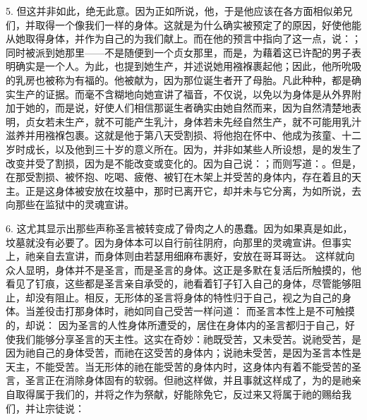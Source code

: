 5. 但这并非如此，绝无此意。因为正如所说，他，于是他应该在各方面相似弟兄们，并取得一个像我们一样的身体。这就是为什么确实被预定了的原因，好使他能从她取得身体，并作为自己的为我们献上。而在他的预言中指向了这一点，说：；同时被派到她那里——不是随便到一个贞女那里，而是，为藉着这已许配的男子表明确实是一个人。为此，也提到她生产，并述说她用襁褓裹起他；因此，他所吮吸的乳房也被称为有福的。他被献为，因为那位诞生者开了母胎。凡此种种，都是确实生产的证据。而毫不含糊地向她宣讲了福音，不仅说，以免以为身体是从外界附加于她的，而是说，好使人们相信那诞生者确实由她自然而来，因为自然清楚地表明，贞女若未生产，就不可能产生乳汁，身体若未先经自然生产，就不可能用乳汁滋养并用襁褓包裹。这就是他于第八天受割损、将他抱在怀中、他成为孩童、十二岁时成长，以及他到三十岁的意义所在。因为，并非如某些人所设想，是的发生了改变并受了割损，因为是不能改变或变化的。因为自己说：；而则写道：。但是，在那受割损、被怀抱、吃喝、疲倦、被钉在木架上并受苦的身体内，存在着且的天主。正是这身体被安放在坟墓中，那时已离开它，却并未与它分离，为如所说，去向那些在监狱中的灵魂宣讲。\par

6. 这尤其显示出那些声称圣言被转变成了骨肉之人的愚蠢。因为如果真是如此，坟墓就没有必要了。因为身体本可以自行前往阴府，向那里的灵魂宣讲。但事实上，祂亲自去宣讲，而身体则由若瑟用细麻布裹好，安放在哥耳哥达。 这样就向众人显明，身体并不是圣言，而是圣言的身体。这正是多默在复活后所触摸的，他看见了钉痕，这些都是圣言亲自承受的，祂看着钉子钉入自己的身体，尽管能够阻止，却没有阻止。相反，无形体的圣言将身体的特性归于自己，视之为自己的身体。当差役击打那身体时，祂如同自己受苦一样问道： 而圣言本性上是不可触摸的，却说： 因为圣言的人性身体所遭受的，居住在身体内的圣言都归于自己，好使我们能够分享圣言的天主性。这实在奇妙：祂既受苦，又未受苦。说祂受苦，是因为祂自己的身体受苦，而祂在这受苦的身体内；说祂未受苦，是因为圣言本性是天主，不能受苦。当无形体的祂在能受苦的身体内时，这身体内有着不能受苦的圣言，圣言正在消除身体固有的软弱。但祂这样做，并且事就这样成了，为的是祂亲自取得属于我们的，并将之作为祭献，好能除免它，反过来又将属于祂的赐给我们，并让宗徒说：\par

